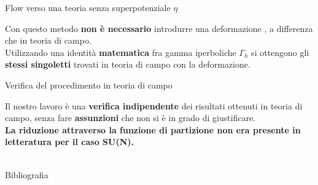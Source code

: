 \documentclass[10pt,compress,usenames,dvipsnames]{beamer}
\begin{document}
\begin{frame}{Flow verso una teoria senza superpotenziale $\eta$}

Con questo metodo \alert{\bfseries non è necessario} introdurre una deformazione , a differenza che in teoria di campo. \\
\vspace{0.5cm}
Utilizzando una identità \alert{\bfseries matematica} fra gamma iperboliche $\Gamma_h$  si ottengono gli \alert{\bfseries stessi singoletti} trovati in teoria di campo con la deformazione.
\\

\end{frame}


\begin{frame}{Verifica del procedimento in teoria di campo}
\begin{center}
{\large   
Il nostro lavoro è una \alert{\bfseries verifica indipendente} dei risultati ottenuti in teoria di campo, senza fare \alert{\bfseries assunzioni} che non si è in grado di giustificare.
\\[0.3cm]
{\alert{\bfseries La riduzione attraverso la funzione di partizione non era presente in letteratura per il caso SU(N).}
}
} 
\\
\vspace{0.5cm}
\\
\end{center}



\end{frame}



\begin{frame}{Bibliografia}
\nocite{*}
{ \footnotesize

}
\end{frame}
\end{document}
